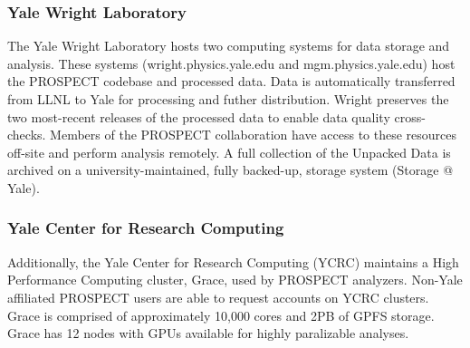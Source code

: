 \subsubsection{Yale Wright Laboratory}
The Yale Wright Laboratory hosts two computing systems for data storage and analysis. 
These systems (wright.physics.yale.edu and mgm.physics.yale.edu) host the PROSPECT codebase and processed data.
Data is automatically transferred from LLNL to Yale for processing and futher distribution. 
Wright preserves the two most-recent releases of the processed data to enable data quality cross-checks.
Members of the PROSPECT collaboration have access to these resources off-site and perform analysis remotely.
A full collection of the Unpacked Data is archived on a university-maintained, fully backed-up, storage system (Storage @ Yale). 
\subsubsection{Yale Center for Research Computing}
Additionally, the Yale Center for Research Computing (YCRC) maintains a High Performance Computing cluster, Grace, used by PROSPECT analyzers.
Non-Yale affiliated PROSPECT users are able to request accounts on YCRC clusters.  
Grace is comprised of approximately 10,000 cores and 2PB of GPFS storage.
Grace has 12 nodes with GPUs available for highly paralizable analyses.


